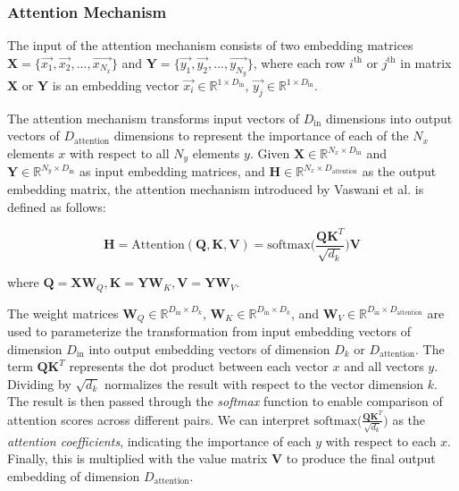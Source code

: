 \subsubsection{Attention Mechanism}
\label{sec:attentionMechanism}

The input of the attention mechanism consists of two embedding matrices $\mathbf{X} = \Big\{\overrightarrow{x_1}, \overrightarrow{x_2}, ...,  \overrightarrow{x_{N_x}}\Big\}$ and $\mathbf{Y} = \Big\{\overrightarrow{y_1}, \overrightarrow{y_2}, ...,  \overrightarrow{y_{N_y}}\Big\}$, where each row $i^{\text{th}}$ or $j^{\text{th}}$ in matrix $\mathbf{X}$ or $\mathbf{Y}$ is an embedding vector $\overrightarrow{x_i} \in \mathbb{R}^{1 \times D_{\text{in}}}$, $\overrightarrow{y_j} \in \mathbb{R}^{1 \times D_{\text{in}}}$.

The attention mechanism transforms input vectors of $D_{\text{in}}$ dimensions into output vectors of $D_{\text{attention}}$ dimensions to represent the importance of each of the $N_x$ elements $x$ with respect to all $N_y$ elements $y$. Given $\mathbf{X} \in \mathbb{R}^{N_x \times D_\text{in}}$ and $\mathbf{Y} \in \mathbb{R}^{N_y \times D_\text{in}}$ as input embedding matrices, and $\mathbf{H} \in \mathbb{R}^{N_x \times D_\text{attention}}$ as the output embedding matrix, the attention mechanism introduced by Vaswani et al. \cite{vaswani2017attention} is defined as follows:

\begin{equation}
	\label{attention}
	\mathbf{H} = \text{Attention}(\mathbf{Q}, \mathbf{K}, \mathbf{V}) = \text{softmax}\Big(\frac{\mathbf{Q}\mathbf{K}^T}{\sqrt{d_k}}\Big) \mathbf{V}
\end{equation}

where $\mathbf{Q} = \mathbf{X}\mathbf{W}_Q, \mathbf{K} = \mathbf{Y} \mathbf{W}_K, \mathbf{V} = \mathbf{Y} \mathbf{W}_V$.

The weight matrices 
$\mathbf{W}_Q \in \mathbb{R}^{D_{\text{in}} \times D_{k}}$, 
$\mathbf{W}_K \in \mathbb{R}^{D_{\text{in}} \times D_{k}}$, and 
$\mathbf{W}_V \in \mathbb{R}^{D_{\text{in}} \times D_{\text{attention}}}$ 
are used to parameterize the transformation from input embedding vectors of dimension $D_{\text{in}}$ into output embedding vectors of dimension $D_k$ or $D_{\text{attention}}$. The term $\mathbf{Q}\mathbf{K}^T$ represents the dot product between each vector $x$ and all vectors $y$. Dividing by $\sqrt{d_k}$ normalizes the result with respect to the vector dimension $k$. The result is then passed through the \textit{softmax} function to enable comparison of attention scores across different pairs. We can interpret $\text{softmax}\Big(\frac{\mathbf{Q}\mathbf{K}^T}{\sqrt{d_k}}\Big)$ as the \textit{attention coefficients}, indicating the importance of each $y$ with respect to each $x$. Finally, this is multiplied with the value matrix $\mathbf{V}$ to produce the final output embedding of dimension $D_{\text{attention}}$.

